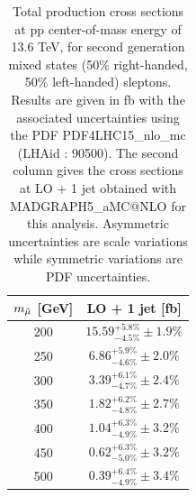 \documentclass{cernatlasnote}
\begin{document}
\begin{appendices}
\begin{table}
    \centering
    \caption{Total production cross sections at pp center-of-mass energy of 13.6 TeV, for second generation mixed states (50\% right-handed, 50\% left-handed) sleptons. Results are given in fb with the associated uncertainties using the PDF PDF4LHC15\_nlo\_mc (LHAid : 90500). The second column gives the cross sections at LO + 1 jet obtained with MADGRAPH5\_aMC@NLO for this analysis. Asymmetric uncertainties are scale variations while symmetric variations are PDF uncertainties.} 
    \label{tab:RLLRXS13p6}
    \smallskip
    \begin{tabular}{ cc }
         $m_{\Tilde{\mu}}$ [GeV] &  LO + 1 jet [fb]\\
         \hline
         200  & $15.59^{+5.8\%}_{-4.5\%} \pm 1.9\%$  \\
         250  & $6.86^{+5.9\%}_{-4.6\%} \pm 2.0\%$ \\
         300  & $3.39^{+6.1\%}_{-4.7\%} \pm 2.4\%$ \\
         350  & $1.82^{+6.2\%}_{-4.8\%} \pm 2.7\%$\\
         400  & $1.04^{+6.3\%}_{-4.9\%} \pm 3.2\%$ \\
         450  & $0.62^{+6.3\%}_{-5.0\%} \pm 3.2\%$ \\
         500  & $0.39^{+6.4\%}_{-4.9\%} \pm 3.4\%$ \\
     \end{tabular}
\end{table}


\end{appendices}
\end{document}

